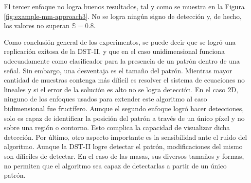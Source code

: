 El tercer enfoque no logra buenos resultados, tal y como se muestra en la Figura \ref{fig:example-mm-approach3}.
No se logra ningún signo de detección y, de hecho, los valores no superan $\mathbb{S}=0.8$. 

Como conclusión general de los experimentos, se puede decir que se logró una replicación exitosa de la DST-II,
y que en el caso unidimensional funciona adecuadamente como clasificador para la presencia de un patrón 
dentro de una señal. Sin embargo, una desventaja es el tamaño del patrón. Mientras mayor cantidad
de muestras contenga más díficil es resolver el sistema de ecuaciones no lineales y si el error de la
solución es alto no se logra detección. 
En el caso 2D, ninguno de los enfoques usados para extender este algoritmo al caso
bidimensional fue fructífero. Aunque el segundo enfoque logró hacer detecciones, solo es capaz
de identificar la posición del patrón a través de un único píxel y no sobre una región o
contorno. Esto complica la capacidad de visualizar
dicha detección. Por último, otro aspecto importante es la sensibilidad ante el ruido del algoritmo. 
Aunque la DST-II logre detectar el patrón, modificaciones del mismo son díficiles de detectar.
En el caso de las masas, sus diversos tamaños y formas, no permiten que el algoritmo sea capaz de detectarlas
a partir de un único patrón.

